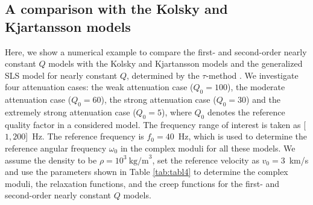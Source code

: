 \documentclass[article]{./macros/elsarticle_qh}
\begin{document}
\subsection{A comparison with the Kolsky and Kjartansson models}
Here, we show a numerical example to compare the first- and second-order nearly constant $Q$ models with the Kolsky and Kjartansson models and the generalized SLS model for nearly constant $Q$, determined by the $\tau$-method \cite[]{blanch:1995,bohlen:2002}. We investigate four attenuation cases: the weak attenuation case ($Q_{0}=100$), the moderate attenuation case ($Q_{0} = 60$), the strong attenuation case ($Q_{0} = 30$) and the extremely strong attenuation case ($Q_{0} = 5$), where $Q_{0}$ denotes the reference quality factor in a considered model. The frequency range of interest is taken as [$1, 200$]~Hz. The reference frequency is $f_{0}=40$~Hz, which is used to determine the reference angular frequency $\omega_{0}$ in the complex moduli for all these models. We assume the density to be $\rho = 10^3~\text{kg/m}^{3}$, set the reference velocity as $v_{0}=3$~km/s and use the parameters shown in Table \ref{tab:tabl4} to determine the complex moduli, the relaxation functions, and the creep functions for the first- and second-order nearly constant $Q$ models. 
\end{document}
